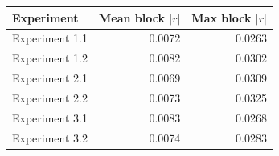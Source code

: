 \begin{tabular}{lrr}
\hline
Experiment & Mean block $|r|$ & Max block $|r|$ \\
\hline
Experiment 1.1 & 0.0072 & 0.0263 \\
Experiment 1.2 & 0.0082 & 0.0302 \\
Experiment 2.1 & 0.0069 & 0.0309 \\
Experiment 2.2 & 0.0073 & 0.0325 \\
Experiment 3.1 & 0.0083 & 0.0268 \\
Experiment 3.2 & 0.0074 & 0.0283 \\
\hline
\end{tabular}

